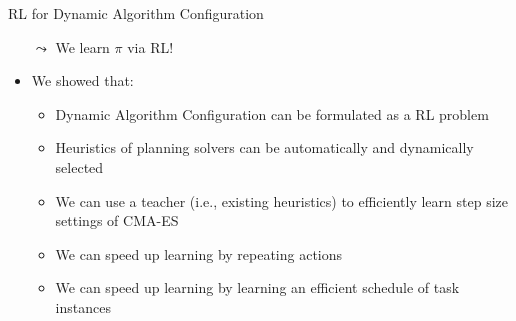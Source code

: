 \begin{frame}[c]{RL for Dynamic Algorithm Configuration}
	
	\begin{itemize}
		\item[$\leadsto$] We learn $\pi$ via RL! 
		\item We showed that:
		\begin{itemize}
			\item Dynamic Algorithm Configuration can be formulated as a RL problem~
			\item Heuristics of planning solvers can be automatically and dynamically selected~
			\item We can use a teacher (i.e., existing heuristics) to efficiently learn step size settings of CMA-ES~
			\item We can speed up learning by repeating actions~
			\item We can speed up learning by learning an efficient schedule of task instances~
		\end{itemize}
	\end{itemize}

	
\end{frame}

